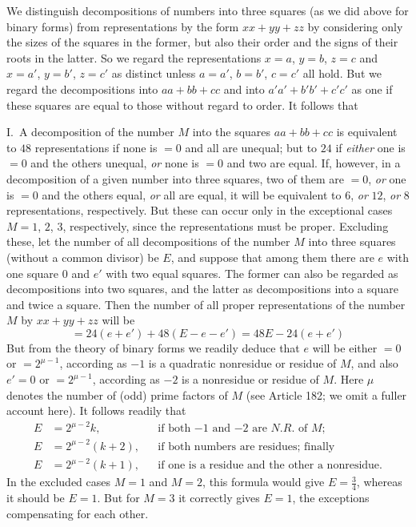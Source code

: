 We distinguish decompositions of numbers into three squares (as we did
above for binary forms) from representations by the form $xx+yy+zz$ by
considering only the sizes of the squares in the former, but also their
order and the signs of their roots in the latter. So we regard the
representations $x=a$, $y=b$, $z=c$ and $x=a'$, $y=b'$, $z=c'$ as
distinct unless $a=a'$, $b=b'$, $c=c'$ all hold. But we regard the
decompositions into $aa+bb+cc$ and into $a'a'+b'b'+c'c'$ as one if these squares
are equal to those without regard to order. It follows that

I.\ A decomposition of the number $M$ into the squares $aa+bb+cc$
is equivalent to $48$ representations if none is $=0$ and
all are unequal; but to $24$ if \textit{either} one is $=0$
and the others unequal, \textit{or} none is $=0$ and two are equal.
If, however, in a decomposition of a given number into three squares,
two of them are $=0$, \textit{or} one is $=0$ and the others
equal, \textit{or} all are equal, it will be equivalent to $6$,
\textit{or} $12$, \textit{or} $8$ representations, respectively.
But these can occur only in the exceptional cases $M=1$, $2$,
$3$, respectively, since the representations must be proper.
Excluding these, let the number of all decompositions of the number
$M$ into three squares (without a common divisor) be $E$,
and suppose that among them there are $e$ with one square $0$
and $e'$ with two equal squares. The former can also be regarded
as decompositions into two squares, and the latter as decompositions
into a square and twice a square. Then the number of all proper
representations of the number $M$ by $xx+yy+zz$ will be
\[
=24(e+e')+48(E-e-e')=48E-24(e+e')
\]
But from the theory of binary forms we readily deduce that $e$
will be either $=0$ or $=2^{\mu-1}$, according as $-1$ is a quadratic
nonresidue or residue of $M$, and also $e'=0$ or $=2^{\mu-1}$, according
as $-2$ is a nonresidue or residue of $M$. Here $\mu$ denotes
the number of (odd) prime factors of $M$ (see Article 182; we
omit a fuller account here). It follows readily that
\[
\begin{aligned}
E&=2^{\mu-2}k,&&\text{if both $-1$ and $-2$ are $N.R.$ of $M$;}\\
E&=2^{\mu-2}(k+2),&&\text{if both numbers are residues; finally}\\
E&=2^{\mu-2}(k+1),&&\text{if one is a residue and the other a nonresidue.}
\end{aligned}
\]
In the excluded cases $M=1$ and $M=2$, this formula would give
$E=\tfrac{3}{4}$, whereas it should be $E=1$. But for $M=3$ it correctly
gives $E=1$, the exceptions compensating for each other.

